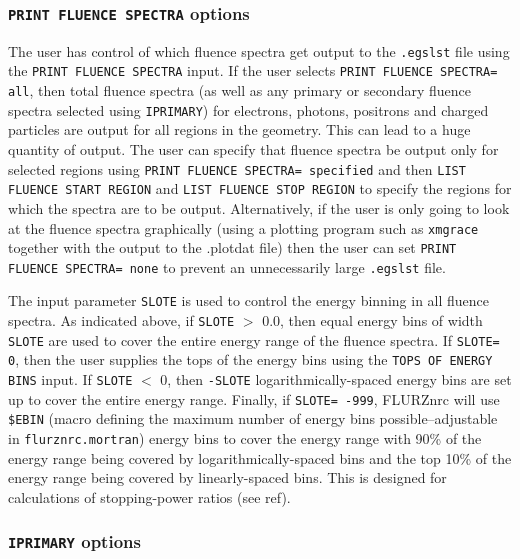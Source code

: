 \documentclass[12pt,twoside]{article}  %
\begin{document}
\subsubsection{{\tt PRINT FLUENCE SPECTRA} options}
\label{flurzprintsect}

The user has control of which fluence spectra get output to the {\tt .egslst}
file using the {\tt PRINT FLUENCE SPECTRA} input.  If the user selects
{\tt PRINT FLUENCE SPECTRA= all}, then total fluence spectra (as well
as any primary or secondary fluence spectra selected using {\tt IPRIMARY})
for electrons,
photons, positrons and charged particles are output for all regions in the
geometry.  This can lead to a huge quantity of output.
The user can specify that fluence spectra be output only for
selected regions using {\tt PRINT FLUENCE SPECTRA= specified} and then
{\tt LIST FLUENCE START REGION} and {\tt LIST FLUENCE STOP REGION} to
specify the regions for which the spectra are to be output.  Alternatively,
if the user is only going to look at the fluence spectra graphically (using a 
plotting program such as {\tt xmgrace} together with the output to the .plotdat
file) then the user can set {\tt PRINT FLUENCE SPECTRA= none} to prevent
an unnecessarily large {\tt .egslst} file.

The input parameter {\tt SLOTE} is used to control the energy binning in
all fluence spectra.  As indicated above, if {\tt SLOTE} $>$ 0.0, then
equal energy bins of width {\tt SLOTE} are used to cover the entire energy
range of the fluence spectra.  If {\tt SLOTE= 0}, then the user supplies the
tops of the energy bins using the {\tt TOPS OF ENERGY BINS} input.  If
{\tt SLOTE} $<$ 0, then {\tt -SLOTE} logarithmically-spaced energy bins are
set up to cover the entire energy range.  Finally, if {\tt SLOTE= -999},
FLURZnrc will use {\tt \$EBIN} (macro defining the maximum number of energy
bins possible--adjustable in {\tt flurznrc.mortran}) energy bins to cover the
energy range with 90\% of the energy range being covered by logarithmically-spaced bins and the top 10\% of the energy range being covered by linearly-spaced
bins.  This is designed for calculations of stopping-power ratios (see
ref\cite{Ma91}).

\subsubsection{{\tt IPRIMARY} options}
\label{flurziprimsect}
\end{document}
